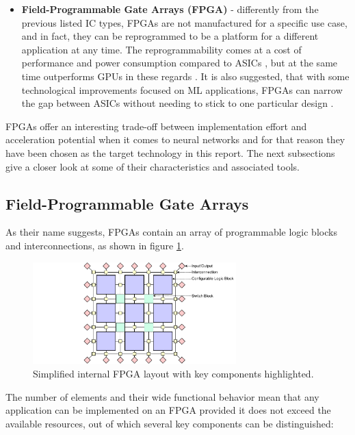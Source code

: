 \begin{itemize}
  \item \textbf{Field-Programmable Gate Arrays (FPGA)} - differently from the previous listed IC types, FPGAs are not manufactured for a specific use case, and in fact, they can be reprogrammed to be a platform for a different application at any time. The reprogrammability comes at a cost of performance and power consumption compared to ASICs \cite{25-boutros2018improve}, but at the same time outperforms GPUs in these regards \cite{27-nurvitadhi2017fpgas, 28-li2018gpu-outperforming}. It is also suggested, that with some technological improvements focused on ML applications, FPGAs can narrow the gap between ASICs without needing to stick to one particular design \cite{25-boutros2018improve, 26-nurvitadhi2016accelerating, 15-nurvitadhi2016accelerating}.

\end{itemize}

FPGAs offer an interesting trade-off between implementation effort and acceleration potential when it comes to neural networks and for that reason they have been chosen as the target technology in this report. The next subsections give a closer look at some of their characteristics and associated tools.

\subsection{Field-Programmable Gate Arrays}
As their name suggests, FPGAs contain an array of programmable logic blocks and interconnections, as shown in figure \ref{fig:fpga-lattice}. 

\begin{figure}[hpt!]
  \centering
  \includegraphics[trim={0cm 0cm 0cm 0cm}, width=0.7\textwidth, center]{background/fpga_lattice.pdf}
  \caption{Simplified internal FPGA layout with key components highlighted.}
  \label{fig:fpga-lattice}
\end{figure}

The number of elements and their wide functional behavior mean that any application can be implemented on an FPGA provided it does not exceed the available resources, out of which several key components can be distinguished:

